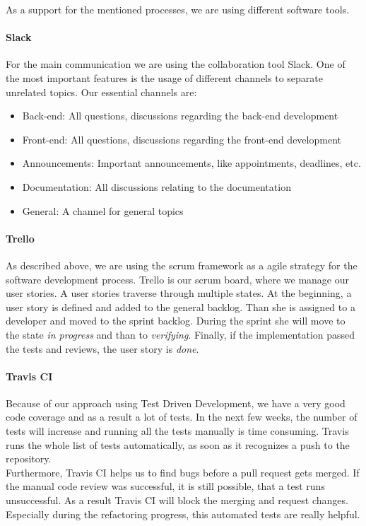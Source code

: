 As a support for the mentioned processes, we are using different software tools.

\paragraph{Slack}

For the main communication we are using the collaboration tool Slack. One of the most important features is the usage of different channels to separate unrelated topics. Our essential channels are:

\begin{itemize}  
\item Back-end: All questions, discussions regarding the back-end development
\item Front-end: All questions, discussions regarding the front-end development
\item Announcements: Important announcements, like appointments, deadlines, etc.
\item Documentation: All discussions relating to the documentation 
\item General: A channel for general topics 
\end{itemize}

\paragraph{Trello}

As described above, we are using the scrum framework as a agile strategy for the software development process. Trello is our scrum board, where we manage our user stories. A user stories traverse through multiple states. At the beginning, a user story is defined and added to the general backlog. Than she is assigned to a developer and moved to the sprint backlog. During the sprint she will move to the state \textit{in progress} and than to \textit{verifying}. Finally, if the implementation passed the tests and reviews, the user story is \textit{done}.

\paragraph{Travis CI}

Because of our approach using Test Driven Development, we have a very good code coverage and as a result a lot of tests. In the next few weeks, the number of tests will increase and running all the tests manually is time consuming. Travis runs the whole list of tests automatically, as soon as it recognizes a push to the repository. 
\\
Furthermore, Travis CI helps us to find bugs before a pull request gets merged. If the manual code review was successful, it is still possible, that a test runs unsuccessful. As a result Travis CI will block the merging and request changes. Especially during the refactoring progress, this automated tests are really helpful. 

